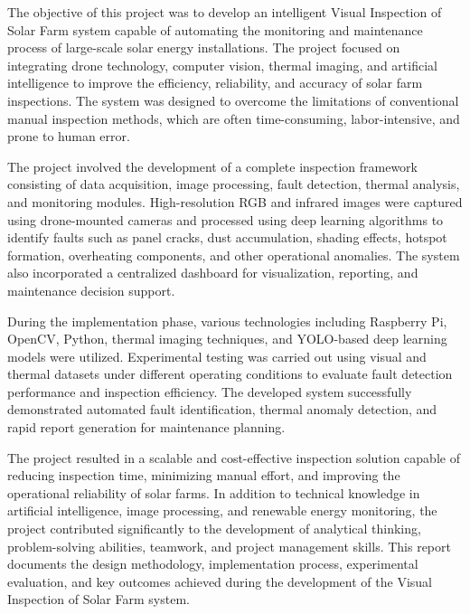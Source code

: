 
\vspace{-1cm}


The objective of this project was to develop an intelligent Visual Inspection of Solar Farm system capable of automating the monitoring and maintenance process of large-scale solar energy installations. The project focused on integrating drone technology, computer vision, thermal imaging, and artificial intelligence to improve the efficiency, reliability, and accuracy of solar farm inspections. The system was designed to overcome the limitations of conventional manual inspection methods, which are often time-consuming, labor-intensive, and prone to human error.

The project involved the development of a complete inspection framework consisting of data acquisition, image processing, fault detection, thermal analysis, and monitoring modules. High-resolution RGB and infrared images were captured using drone-mounted cameras and processed using deep learning algorithms to identify faults such as panel cracks, dust accumulation, shading effects, hotspot formation, overheating components, and other operational anomalies. The system also incorporated a centralized dashboard for visualization, reporting, and maintenance decision support.

During the implementation phase, various technologies including Raspberry Pi, OpenCV, Python, thermal imaging techniques, and YOLO-based deep learning models were utilized. Experimental testing was carried out using visual and thermal datasets under different operating conditions to evaluate fault detection performance and inspection efficiency. The developed system successfully demonstrated automated fault identification, thermal anomaly detection, and rapid report generation for maintenance planning.

The project resulted in a scalable and cost-effective inspection solution capable of reducing inspection time, minimizing manual effort, and improving the operational reliability of solar farms. In addition to technical knowledge in artificial intelligence, image processing, and renewable energy monitoring, the project contributed significantly to the development of analytical thinking, problem-solving abilities, teamwork, and project management skills. This report documents the design methodology, implementation process, experimental evaluation, and key outcomes achieved during the development of the Visual Inspection of Solar Farm system.

\pagebreak

